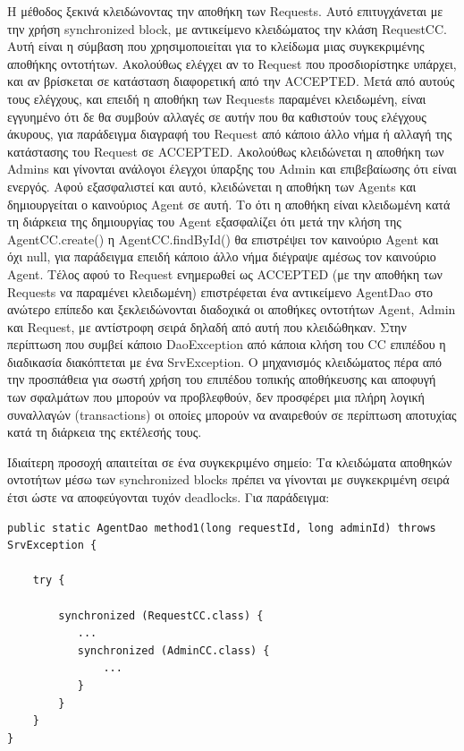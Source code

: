 \documentclass[a4paper,11pt]{article}
\begin{document}
\begin{sloppypar}
Η μέθοδος ξεκινά κλειδώνοντας την αποθήκη των Requests. Αυτό επιτυγχάνεται με την χρήση synchronized block, με αντικείμενο κλειδώματος την κλάση RequestCC. Αυτή είναι η σύμβαση που χρησιμοποιείται για το κλείδωμα μιας συγκεκριμένης αποθήκης οντοτήτων. Ακολούθως ελέγχει αν το Request που προσδιορίστηκε υπάρχει, και αν βρίσκεται σε κατάσταση διαφορετική από την ACCEPTED. Μετά από αυτούς τους ελέγχους, και επειδή η αποθήκη των Requests παραμένει κλειδωμένη, είναι εγγυημένο ότι δε θα συμβούν αλλαγές σε αυτήν που θα καθιστούν τους ελέγχους άκυρους, για παράδειγμα διαγραφή του Request από κάποιο άλλο νήμα ή αλλαγή της κατάστασης του Request σε ACCEPTED. Ακολούθως κλειδώνεται η αποθήκη των Admins και γίνονται ανάλογοι έλεγχοι ύπαρξης του Admin και επιβεβαίωσης ότι είναι ενεργός. Αφού εξασφαλιστεί και αυτό, κλειδώνεται η αποθήκη των Agents και δημιουργείται ο καινούριος Agent σε αυτή. Το ότι η αποθήκη είναι κλειδωμένη κατά τη διάρκεια της δημιουργίας του Agent εξασφαλίζει ότι μετά την κλήση της AgentCC.create() η AgentCC.findById() θα επιστρέψει τον καινούριο Agent και όχι null, για παράδειγμα επειδή κάποιο άλλο νήμα διέγραψε αμέσως τον καινούριο Agent. Τέλος αφού το Request ενημερωθεί ως ACCEPTED (με την αποθήκη των Requests να παραμένει κλειδωμένη) επιστρέφεται ένα αντικείμενο AgentDao στο ανώτερο επίπεδο και ξεκλειδώνονται διαδοχικά οι αποθήκες οντοτήτων Agent, Admin και Request, με αντίστροφη σειρά δηλαδή από αυτή που κλειδώθηκαν. Στην περίπτωση που συμβεί κάποιο DaoException από κάποια κλήση του CC επιπέδου η διαδικασία διακόπτεται με ένα SrvException. Ο μηχανισμός κλειδώματος πέρα από την προσπάθεια για σωστή χρήση του επιπέδου τοπικής αποθήκευσης και αποφυγή των σφαλμάτων που μπορούν να προβλεφθούν, δεν προσφέρει μια πλήρη λογική συναλλαγών (transactions) οι οποίες μπορούν να αναιρεθούν σε περίπτωση αποτυχίας κατά τη διάρκεια της εκτέλεσής τους.

Ιδιαίτερη προσοχή απαιτείται σε ένα συγκεκριμένο σημείο: Τα κλειδώματα αποθηκών οντοτήτων μέσω των synchronized blocks πρέπει να γίνονται με συγκεκριμένη σειρά έτσι ώστε να αποφεύγονται τυχόν deadlocks. Για παράδειγμα:

\begin{lstlisting}
public static AgentDao method1(long requestId, long adminId) throws SrvException {

    try {

        synchronized (RequestCC.class) {
           ...
           synchronized (AdminCC.class) {
               ...
           }
        }
    }
}


\end{lstlisting}
\end{sloppypar}
\end{document}
